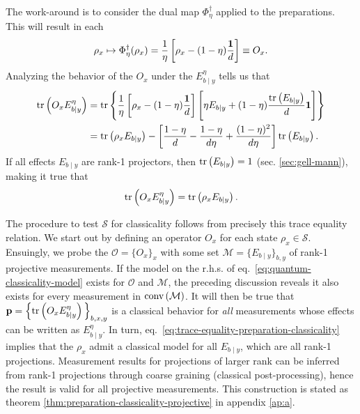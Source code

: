         The work-around is to consider the dual map $\Phi_\eta^\dagger$ applied to the preparations. This will result in each
        \begin{equation}
            \rho_x \mapsto \Phi_\eta^\dagger(\rho_x) = \frac{1}{\eta} \left[ \rho_x - (1 - \eta) \frac{\mathbf{1}}{d} \right] \equiv O_x .
            \label{eq:polarized-preparations}
        \end{equation}
        Analyzing the behavior of the $O_x$ under the $E_{b \mid y}^\eta$ tells us that
        \begin{align*}
            \text{tr}\left( O_x E_{b \mid y}^\eta \right) &= \text{tr}\left\{ \frac{1}{\eta} \left[ \rho_x - (1 - \eta) \frac{\mathbf{1}}{d} \right]  \left[ \eta E_{b \mid y} + (1 - \eta) \frac{ \text{tr}\left( E_{b \mid y} \right) }{d} \mathbf{1} \right] \right\} \\
            &= \text{tr}\left( \rho_x E_{b \mid y} \right) - \left[ \frac{1 - \eta}{d} - \frac{ 1 - \eta }{ d \eta }  + \frac{ (1 - \eta)^2 }{ d \eta } \right] \text{tr}\left( E_{b \mid y} \right).
        \end{align*}
        If all effects $E_{b \mid y}$ are rank-1 projectors, then $\text{tr}\left( E_{b \mid y} \right) = 1$ (sec. \ref{sec:gell-mann}), making it true that
        \begin{equation}
            \text{tr}\left( O_x E_{b \mid y}^\eta \right) = \text{tr}\left( \rho_x E_{b \mid y} \right).
            \label{eq:trace-equality-preparation-classicality}
        \end{equation}

        The procedure to test $\mathcal{S}$ for classicality follows from precisely this trace equality relation. We start out by defining an operator $O_x$ for each state $\rho_x \in \mathcal{S}$. Ensuingly, we probe the $\mathcal{O} = \{ O_x \}_x$ with some set $\mathcal{M} = \{ E_{b \mid y} \}_{b,y}$ of rank-1 projective measurements. If the model on the r.h.s. of eq.~\eqref{eq:quantum-classicality-model} exists for $\mathcal{O}$ and $\mathcal{M}$, the preceding discussion reveals it also exists for every measurement in $\text{conv} \left( \mathcal{M} \right)$. It will then be true that $\mathbf{p} = \Big\{ \text{tr}\left( O_x E_{b \mid y}^\eta \right) \Big\}_{b,x,y}$ is a classical behavior for \emph{all} measurements whose effects can be written as $E_{b \mid y}^\eta$. In turn, eq.~\eqref{eq:trace-equality-preparation-classicality} implies that the $\rho_x$ admit a classical model for all $E_{b \mid y}$, which are all rank-1 projections. Measurement results for projections of larger rank can be inferred from rank-1 projections through coarse graining (classical post-processing), hence the result is valid for all projective measurements. This construction is stated as theorem \ref{thm:preparation-classicality-projective} in appendix \ref{ap:a}.

